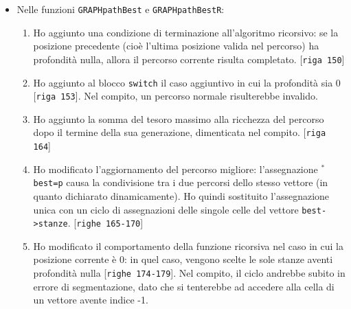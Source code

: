 \documentclass[a4paper]{article}
\newcommand{\code}[1]{\texttt{#1}}
\newcommand{\riga}[1]{[\code{riga #1}]}
\newcommand{\righe}[1]{[\code{righe #1}]}
\begin{document}
\begin{itemize}
\begin{enumerate}
                \item Ho aggiunto il controllo che il percorso passato sia "completo": se il percorso è stato analizzato interamente, risulta interrotto (l'ultima stanza non è un'uscita) e non si sono verificate le condizioni di interruzione, allora il percorso viene considerato come non valido. \righe{128-129}
                \item Ho rimosso il blocco
                    \begin{center}
                        \code{if(p.stanze[i-1].profondita != 0)}
                    \end{center}
                    portando fuori il \code{switch} al suo interno. Si tratta di una parte di codice non cancellato completamente durante la prova.
                \item Ho aggiunto al blocco \code{switch} il caso aggiuntivo in cui la profondità sia 0 \riga{133}. Nel compito, un percorso normale risulterebbe invalido.
            \end{enumerate}
        \item Nelle funzioni \code{GRAPHpathBest} e \code{GRAPHpathBestR}:
            \begin{enumerate}
                \item Ho aggiunto una condizione di terminazione all'algoritmo ricorsivo: se la posizione precedente (cioè l'ultima posizione valida nel percorso) ha profondità nulla, allora il percorso corrente risulta completato. \riga{150}
                \item Ho aggiunto al blocco \code{switch} il caso aggiuntivo in cui la profondità sia 0 \riga{153}. Nel compito, un percorso normale risulterebbe invalido.
                \item Ho aggiunto la somma del tesoro massimo alla ricchezza del percorso dopo il termine della sua generazione, dimenticata nel compito. \riga{164}
                \item Ho modificato l'aggiornamento del percorso migliore: l'assegnazione \code{$^*$best=p} causa la condivisione tra i due percorsi dello stesso vettore (in quanto dichiarato dinamicamente). Ho quindi sostituito l'assegnazione unica con un ciclo di assegnazioni delle singole celle del vettore \code{best->stanze}. \righe{165-170}
                \item Ho modificato il comportamento della funzione ricorsiva nel caso in cui la posizione corrente è 0: in quel caso, vengono scelte le sole stanze aventi profondità nulla \righe{174-179}. Nel compito, il ciclo andrebbe subito in errore di segmentazione, dato che si tenterebbe ad accedere alla cella di un vettore avente indice -1.

\end{enumerate}
\end{itemize}
\end{document}
